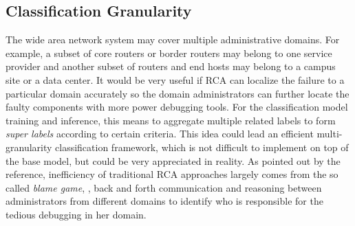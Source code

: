 \subsection{Classification Granularity} 
\label{sub:ml:granularity}
The wide area network system may cover multiple administrative domains. For example, a subset of core routers or border routers may belong to one service provider and another subset of routers and end hosts may belong to a campus site or a data center. It would be very useful if RCA can localize the failure to a particular domain accurately so the domain administrators can further locate the faulty components with more power debugging tools. For the classification model training and inference, this means to aggregate multiple related labels to form {\it super labels} according to certain criteria. This idea could lead an efficient multi-granularity classification framework, which is not difficult to implement on top of the base model, but could be very appreciated in reality. As pointed out by the reference, inefficiency of traditional RCA approaches largely comes from the so called {\it blame game}, \ie, back and forth communication and reasoning between administrators from different domains to identify who is responsible for the tedious debugging in her domain. 





